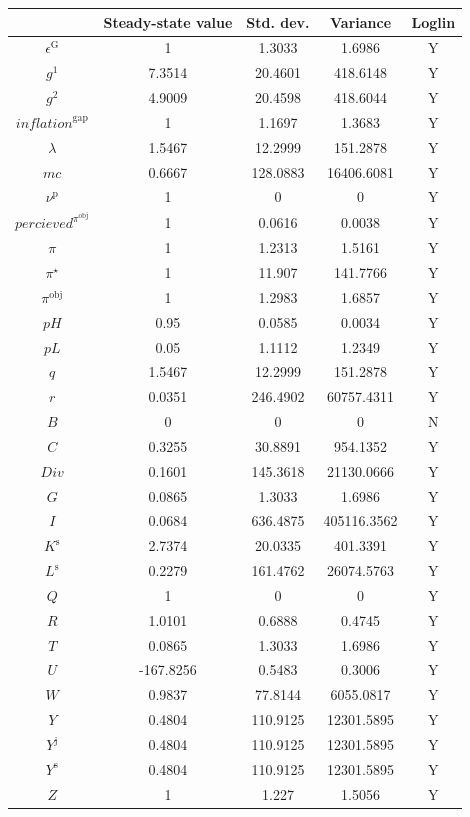 \begin{tabular}{c|c|c|c|c|}
  & Steady-state value & Std. dev. & Variance & Loglin\\
\hline
$\epsilon^{\mathrm{G}}$ & 1 & 1.3033 & 1.6986 & Y    \\
$g^{\mathrm{1}}$ & 7.3514 & 20.4601 & 418.6148 & Y    \\
$g^{\mathrm{2}}$ & 4.9009 & 20.4598 & 418.6044 & Y    \\
${i\!n\!f\!l\!a\!t\!i\!o\!n}^{\mathrm{gap}}$ & 1 & 1.1697 & 1.3683 & Y    \\
$\lambda$ & 1.5467 & 12.2999 & 151.2878 & Y    \\
${m\!c}$ & 0.6667 & 128.0883 & 16406.6081 & Y    \\
$\nu^{\mathrm{p}}$ & 1 & 0 & 0 & Y    \\
${p\!e\!r\!c\!i\!e\!v\!e\!d}^{\pi^{\mathrm{obj}}}$ & 1 & 0.0616 & 0.0038 & Y    \\
$\pi$ & 1 & 1.2313 & 1.5161 & Y    \\
$\pi^{\star}$ & 1 & 11.907 & 141.7766 & Y    \\
$\pi^{\mathrm{obj}}$ & 1 & 1.2983 & 1.6857 & Y    \\
${p\!H}$ & 0.95 & 0.0585 & 0.0034 & Y    \\
${p\!L}$ & 0.05 & 1.1112 & 1.2349 & Y    \\
$q$ & 1.5467 & 12.2999 & 151.2878 & Y    \\
$r$ & 0.0351 & 246.4902 & 60757.4311 & Y    \\
$B$ & 0 & 0 & 0 & N    \\
$C$ & 0.3255 & 30.8891 & 954.1352 & Y    \\
${D\!i\!v}$ & 0.1601 & 145.3618 & 21130.0666 & Y    \\
$G$ & 0.0865 & 1.3033 & 1.6986 & Y    \\
$I$ & 0.0684 & 636.4875 & 405116.3562 & Y    \\
$K^{\mathrm{s}}$ & 2.7374 & 20.0335 & 401.3391 & Y    \\
$L^{\mathrm{s}}$ & 0.2279 & 161.4762 & 26074.5763 & Y    \\
$Q$ & 1 & 0 & 0 & Y    \\
$R$ & 1.0101 & 0.6888 & 0.4745 & Y    \\
$T$ & 0.0865 & 1.3033 & 1.6986 & Y    \\
$U$ & -167.8256 & 0.5483 & 0.3006 & Y    \\
$W$ & 0.9837 & 77.8144 & 6055.0817 & Y    \\
$Y$ & 0.4804 & 110.9125 & 12301.5895 & Y    \\
$Y^{\mathrm{j}}$ & 0.4804 & 110.9125 & 12301.5895 & Y    \\
$Y^{\mathrm{s}}$ & 0.4804 & 110.9125 & 12301.5895 & Y    \\
$Z$ & 1 & 1.227 & 1.5056 & Y    \\
\hline
\end{tabular}


